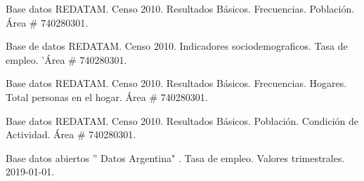 




\newpage

\begin{thebibliography}{99}

 Base datos REDATAM. Censo 2010. Resultados Básicos. Frecuencias. Población. Área \# 740280301.

Base de datos REDATAM. Censo 2010. Indicadores sociodemograficos. Tasa de empleo. 'Área \# 740280301.

 Base datos REDATAM. Censo 2010. Resultados Básicos. Frecuencias. Hogares. Total personas en el hogar. Área \# 740280301.

 Base datos REDATAM. Censo 2010. Resultados Básicos. Población. Condición de Actividad. Área \# 740280301.

 Base datos abiertos '' Datos Argentina" . Tasa de empleo. Valores trimestrales. 2019-01-01.


\end{thebibliography}

\newpage